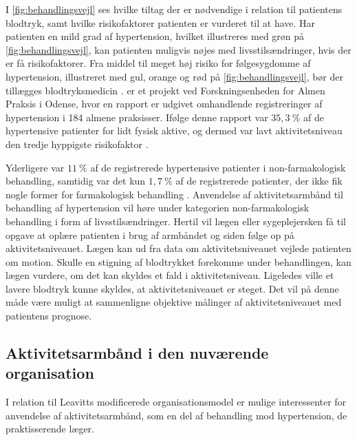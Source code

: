 \noindent
I \autoref{fig:behandlingsvejl} ses hvilke tiltag der er nødvendige i relation til patientens blodtryk, samt hvilke risikofaktorer patienten er vurderet til at have. Har patienten en mild grad af hypertension, hvilket illustreres med grøn på \autoref{fig:behandlingsvejl}, kan patienten muligvis nøjes med livsstilsændringer, hvis der er få risikofaktorer. Fra middel til meget høj risiko for følgesygdomme af hypertension, illustreret med gul, orange og rød på \autoref{fig:behandlingsvejl}, bør der tillægges blodtryksmedicin \citep{bech2015}.
 er et projekt ved Forskningsenheden for Almen Praksis i Odense, hvor en rapport er udgivet omhandlende registreringer af hypertension i 184 almene praksisser. Ifølge denne rapport var $35,3~\%$ af de hypertensive patienter for lidt fysisk aktive, og dermed var lavt aktivitetsniveau den tredje hyppigste risikofaktor \citep{munck2007}.

Yderligere var $11~\%$ af de registrerede hypertensive patienter i non-farmakologisk behandling, samtidig var det kun $1,7~\%$ af de registrerede patienter, der ikke fik nogle former for farmakologisk behandling \citep{munck2007}.
Anvendelse af aktivitetsarmbånd til behandling af hypertension vil høre under kategorien non-farmakologisk behandling i form af livsstilsændringer. Hertil vil lægen eller sygeplejersken få til opgave at oplære patienten i brug af armbåndet og siden følge op på aktivitetsniveauet. Lægen kan ud fra data om aktivitetsniveauet vejlede patienten om motion. 
Skulle en stigning af blodtrykket forekomme under behandlingen, kan lægen vurdere, om det kan skyldes et fald i aktivitetsniveau. Ligeledes ville et lavere blodtryk kunne skyldes, at aktivitetsniveauet er steget. Det vil på denne måde være muligt at sammenligne objektive målinger af aktivitetsniveauet med patientens prognose. 

\subsection{Aktivitetsarmbånd i den nuværende organisation}
I relation til Leavitts modificerede organisationsmodel er mulige interessenter for anvendelse af aktivitetsarmbånd, som en del af behandling mod hypertension, de praktisserende læger.

